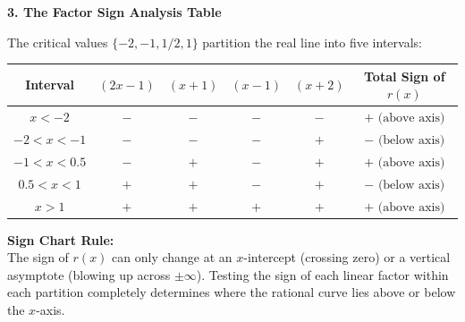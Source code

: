 \documentclass[10.5pt]{article}
\begin{document}
\vspace{0.03in}

\textbf{\large 3. The Factor Sign Analysis Table}

The critical values $\{-2, -1, 1/2, 1\}$ partition the real line into five intervals:
\begin{center}
\begin{tabular}{|c|c|c|c|c||c|}
  \hline
  Interval & $(2x - 1)$ & $(x + 1)$ & $(x - 1)$ & $(x + 2)$ & \textbf{Total Sign of $r(x)$} \\
  \hline
  $x < -2$ & $-$ & $-$ & $-$ & $-$ & $\mathbf{+} \text{ (above axis)}$ \\
  $-2 < x < -1$ & $-$ & $-$ & $-$ & $+$ & $\mathbf{-} \text{ (below axis)}$ \\
  $-1 < x < 0.5$ & $-$ & $+$ & $-$ & $+$ & $\mathbf{+} \text{ (above axis)}$ \\
  $0.5 < x < 1$ & $+$ & $+$ & $-$ & $+$ & $\mathbf{-} \text{ (below axis)}$ \\
  $x > 1$ & $+$ & $+$ & $+$ & $+$ & $\mathbf{+} \text{ (above axis)}$ \\
  \hline
\end{tabular}
\end{center}

\vspace{0.02in}

\begin{tcolorbox}[colback=chalkblue!6, colframe=chalkblue, boxrule=1pt, arc=3pt, left=8pt, right=8pt, top=4pt, bottom=4pt]
\textbf{Sign Chart Rule:}\\[1pt]
The sign of $r(x)$ can only change at an $x$-intercept (crossing zero) or a vertical asymptote (blowing up across $\pm\infty$). Testing the sign of each linear factor within each partition completely determines where the rational curve lies above or below the $x$-axis.
\end{tcolorbox}
\end{document}
